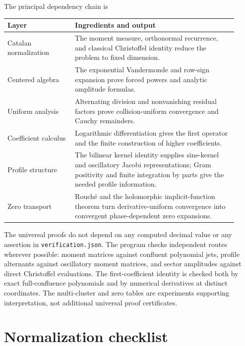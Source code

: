 \documentclass[11pt,a4paper]{article}
\numberwithin{equation}{section}
\theoremstyle{definition}
\theoremstyle{remark}
\begin{document}
The principal dependency chain is
\begin{center}
\begin{tabular}{p{0.27\linewidth}p{0.65\linewidth}}
\toprule
Layer&Ingredients and output\\
\midrule
Catalan normalization&The moment measure, orthonormal recurrence, and
classical Christoffel identity reduce the problem to fixed dimension.\\[3pt]
Centered algebra&The exponential Vandermonde and row-sign expansion
prove forced powers and analytic amplitude formulas.\\[3pt]
Uniform analysis&Alternating division and nonvanishing residual factors
prove collision-uniform convergence and Cauchy remainders.\\[3pt]
Coefficient calculus&Logarithmic differentiation gives the first
operator and the finite construction of higher coefficients.\\[3pt]
Profile structure&The bilinear kernel identity supplies sine-kernel and
oscillatory Jacobi representations; Gram positivity and finite
integration by parts give the needed profile information.\\[3pt]
Zero transport&Rouch\'e and the holomorphic implicit-function theorem
turn derivative-uniform convergence into convergent phase-dependent
zero expansions.\\
\bottomrule
\end{tabular}
\end{center}
The universal proofs do not depend on any computed decimal value or any
assertion in \nolinkurl{verification.json}. The program checks independent
routes wherever possible: moment matrices against confluent polynomial
jets, profile alternants against oscillatory moment matrices, and sector
amplitudes against direct Christoffel evaluations. The first-coefficient
identity is checked both by exact full-confluence polynomials and by
numerical derivatives at distinct coordinates. The multi-cluster and
zero tables are experiments supporting interpretation, not additional
universal proof certificates.


\section{Normalization checklist}\label{ic:app:checklist}
\end{document}
